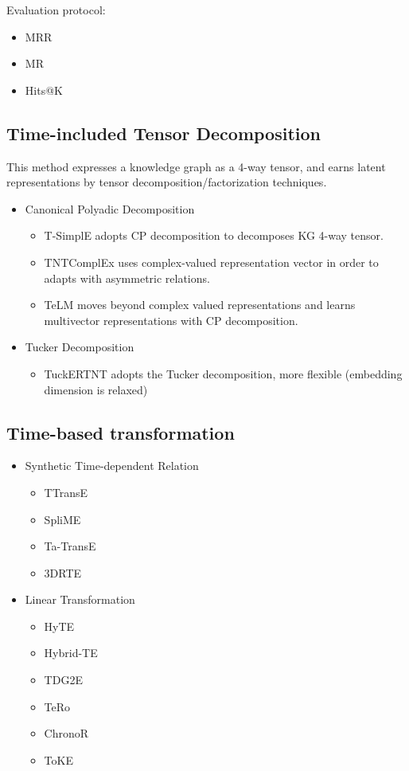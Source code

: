 \documentclass[12pt]{article}
\begin{document}
Evaluation protocol:
\begin{itemize}
    \item MRR 
    \item MR 
    \item Hits@K
\end{itemize}

\subsection{Time-included Tensor Decomposition}

This method expresses a knowledge graph as a 4-way tensor, and earns latent representations by
tensor decomposition/factorization techniques.

\begin{itemize}
    \item Canonical Polyadic Decomposition
    \begin{itemize}
        \item T-SimplE adopts CP decomposition to decomposes KG 4-way tensor.
        \item TNTComplEx uses complex-valued representation vector in order to adapts with asymmetric relations.
        \item TeLM moves beyond complex valued representations and learns multivector representations with CP decomposition.
    \end{itemize}
    \item Tucker Decomposition
    \begin{itemize}
        \item TuckERTNT adopts the Tucker decomposition, more flexible (embedding dimension is relaxed)
    \end{itemize}
\end{itemize}

\subsection{Time-based transformation}

\begin{itemize}
    \item Synthetic Time-dependent Relation
    \begin{itemize}
        \item TTransE
        \item SpliME
        \item Ta-TransE
        \item 3DRTE
    \end{itemize}
    \item Linear Transformation
    \begin{itemize}
        \item HyTE
        \item Hybrid-TE
        \item TDG2E
        \item TeRo
        \item ChronoR
        \item ToKE
    \end{itemize}
\end{itemize}
\end{document}
